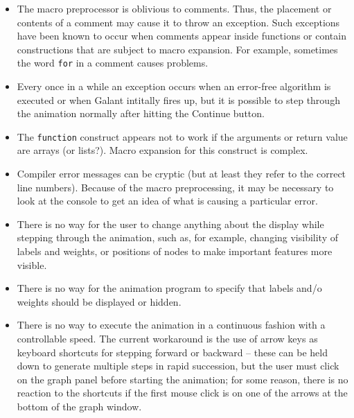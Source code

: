 \begin{itemize}

\item
The macro preprocessor is oblivious to comments. Thus, the placement or contents of a comment may cause it to throw an exception.
Such exceptions have been known to occur when comments appear inside functions
or contain constructions that are subject to macro expansion.
For example, sometimes the word \texttt{for} in a comment causes problems.

\item Every once in a while an exception occurs when an error-free algorithm
  is executed or when Galant intitally fires up, but it is possible to step
  through the animation normally after hitting the \textsf{Continue} button.

\item 
  The \texttt{function} construct appears not to work if the arguments or
  return value are arrays (or lists?).
  Macro expansion for this construct is complex.

\item
Compiler error messages can be cryptic (but at least they refer to the correct
line numbers). Because of the macro preprocessing, it may be necessary to look at the console to get an idea of what is causing a particular error.

\item
There is no way for the user to change anything about the display while stepping through the animation, such as, for example, changing visibility of labels and weights,
or positions of nodes to make important features more visible.

\item
There is no way for the animation program to specify that labels and/o weights
should be displayed or hidden.

\item
There is no way to execute the animation in a continuous fashion with a
controllable speed. The current workaround is the use of arrow keys as keyboard
shortcuts for stepping forward or backward -- these can be held down to
generate multiple steps in rapid succession, but the user must click on the
graph panel before starting the animation; for some reason, there is no
reaction to the shortcuts if the first mouse click is on one of the arrows at the bottom of the graph window.

\end{itemize}

